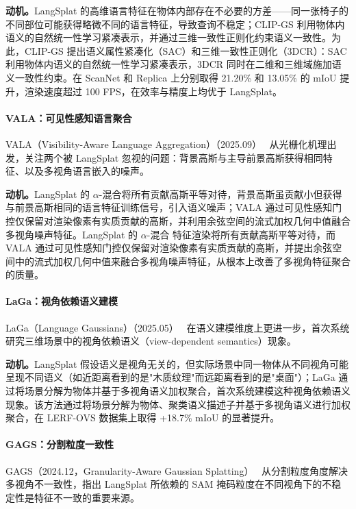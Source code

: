 \textbf{动机。}LangSplat 的高维语言特征在物体内部存在不必要的方差——同一张椅子的不同部位可能获得略微不同的语言特征，导致查询不稳定；CLIP-GS 利用物体内语义的自然统一性学习紧凑表示，并通过三维一致性正则化约束语义一致性。为此，CLIP-GS 提出语义属性紧凑化（SAC）和三维一致性正则化（3DCR）：SAC 利用物体内语义的自然统一性学习紧凑表示，3DCR 同时在二维和三维域施加语义一致性约束。在 ScanNet 和 Replica 上分别取得 21.20\% 和 13.05\% 的 mIoU 提升，渲染速度超过 100 FPS，在效率与精度上均优于 LangSplat。

\paragraph{VALA：可见性感知语言聚合} VALA（Visibility-Aware Language Aggregation）（2025.09）~\cite{2509_05515} 从光栅化机理出发，关注两个被 LangSplat 忽视的问题：背景高斯与主导前景高斯获得相同特征、以及多视角语言嵌入的噪声。

\textbf{动机。}LangSplat 的 $\alpha$-混合将所有贡献高斯平等对待，背景高斯虽贡献小但获得与前景高斯相同的语言特征训练信号，引入语义噪声；VALA 通过可见性感知门控仅保留对渲染像素有实质贡献的高斯，并利用余弦空间的流式加权几何中值融合多视角噪声特征。LangSplat 的 $\alpha$-混合 特征渲染将所有贡献高斯平等对待，而 VALA 通过可见性感知门控仅保留对渲染像素有实质贡献的高斯，并提出余弦空间中的流式加权几何中值来融合多视角噪声特征，从根本上改善了多视角特征聚合的质量。

\paragraph{LaGa：视角依赖语义建模} LaGa（Language Gaussians）（2025.05）~\cite{2505_24746} 在语义建模维度上更进一步，首次系统研究三维场景中的视角依赖语义（view-dependent semantics）现象。

\textbf{动机。}LangSplat 假设语义是视角无关的，但实际场景中同一物体从不同视角可能呈现不同语义（如近距离看到的是"木质纹理"而远距离看到的是"桌面"）；LaGa 通过将场景分解为物体并基于多视角语义加权聚合，首次系统建模这种视角依赖语义现象。该方法通过将场景分解为物体、聚类语义描述子并基于多视角语义进行加权聚合，在 LERF-OVS 数据集上取得 +18.7\% mIoU 的显著提升。

\paragraph{GAGS：分割粒度一致性} GAGS（2024.12，Granularity-Aware Gaussian Splatting）~\cite{2412_13654} 从分割粒度角度解决多视角不一致性，指出 LangSplat 所依赖的 SAM 掩码粒度在不同视角下的不稳定性是特征不一致的重要来源。

